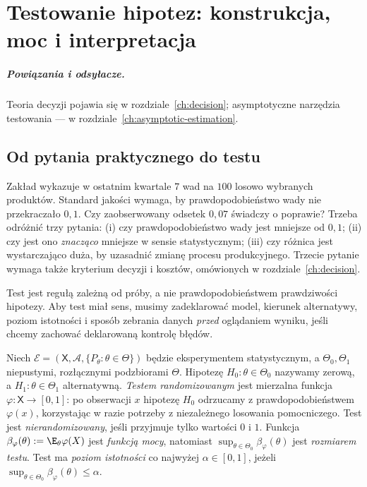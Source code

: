 \chapter{Testowanie hipotez: konstrukcja, moc i interpretacja}
\label{ch:testing}
\paragraph{Powiązania i odsyłacze.} Teoria decyzji pojawia się w rozdziale~\ref{ch:decision}; asymptotyczne narzędzia testowania — w rozdziale~\ref{ch:asymptotic-estimation}.


\section{Od pytania praktycznego do testu}
Zakład wykazuje w ostatnim kwartale $7$ wad na $100$ losowo wybranych
produktów. Standard jakości wymaga, by prawdopodobieństwo wady nie
przekraczało $0{,}1$. Czy zaobserwowany odsetek $0{,}07$ świadczy o
poprawie? Trzeba odróżnić trzy pytania: (i) czy prawdopodobieństwo
wady jest mniejsze od $0{,}1$; (ii) czy jest ono \emph{znacząco}
mniejsze w sensie statystycznym; (iii) czy różnica jest wystarczająco
duża, by uzasadnić zmianę procesu produkcyjnego. Trzecie pytanie
wymaga także kryterium decyzji i kosztów, omówionych w rozdziale~\ref{ch:decision}.

Test jest regułą zależną od próby, a nie prawdopodobieństwem
prawdziwości hipotezy. Aby test miał sens, musimy zadeklarować
model, kierunek alternatywy, poziom istotności i sposób zebrania danych
\emph{przed} oglądaniem wyniku, jeśli chcemy zachować deklarowaną
kontrolę błędów.

\begin{definicja}\label{def:statistical-test}
Niech $\mathcal E=(\mathsf X,\mathcal A,\{P_\theta:\theta\in\Theta\})$
będzie eksperymentem statystycznym, a $\Theta_0,\Theta_1$
niepustymi, rozłącznymi podzbiorami $\Theta$.
Hipotezę $H_0:\theta\in\Theta_0$ nazywamy zerową, a
$H_1:\theta\in\Theta_1$ alternatywną. \emph{Testem
randomizowanym} jest mierzalna funkcja
$\varphi:\mathsf X\to[0,1]$: po obserwacji $x$ hipotezę $H_0$
odrzucamy z prawdopodobieństwem $\varphi(x)$, korzystając w razie
potrzeby z niezależnego losowania pomocniczego. Test jest
\emph{nierandomizowany}, jeśli przyjmuje tylko wartości $0$ i $1$.
Funkcja $\beta_\varphi(\theta):=\E_\theta\varphi(X)$ jest
\emph{funkcją mocy}, natomiast
$\sup_{\theta\in\Theta_0}\beta_\varphi(\theta)$ jest
\emph{rozmiarem testu}. Test ma \emph{poziom istotności} co najwyżej
$\alpha\in[0,1]$, jeżeli $\sup_{\theta\in\Theta_0}\beta_\varphi(\theta)
\le\alpha$.
\end{definicja}


